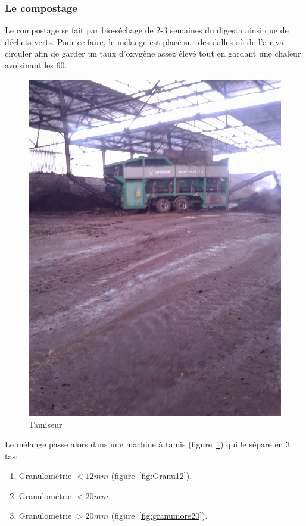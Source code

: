 \subsubsection{Le compostage}
Le compostage se fait par bio-séchage de 2-3 semaines du digesta ainsi que de déchets verts. Pour ce faire, le mélange est placé sur des dalles où de l'air va circuler afin de garder un taux d'oxygène assez élevé tout en gardant une chaleur avoisinant les \unit{60}{\celsius}.
\begin{figure}
  \centering
  \includegraphics[scale=0.07]{task7/tenneville/IMG_20141105_102726.jpg}
  \caption{Tamiseur}
  \label{fig:tamiseur}
\end{figure}
Le mélange passe alors dans une machine à tamis (figure~\ref{fig:tamiseur}) qui le sépare en 3 tas:
\begin{enumerate}
\item Granulométrie $< \unit{12}{mm}$ (figure~\ref{fig:Granu12}).
\item Granulométrie $< \unit{20}{mm}$.
\item Granulométrie $> \unit{20}{mm}$ (figure~\ref{fig:granumore20}).
\end{enumerate}
